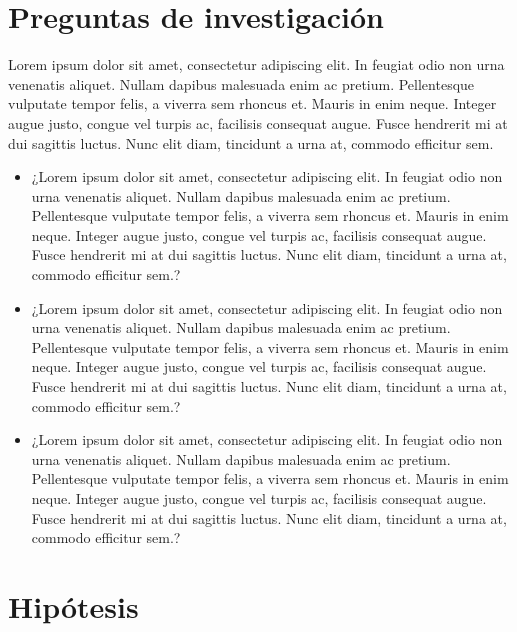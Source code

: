 \documentclass[letterpaper,twoside,10pt]{report}
\begin{document}
\section{Preguntas de investigación}

Lorem ipsum dolor sit amet, consectetur adipiscing elit. In feugiat odio non urna venenatis aliquet. Nullam dapibus malesuada enim ac pretium. Pellentesque vulputate tempor felis, a viverra sem rhoncus et. Mauris in enim neque. Integer augue justo, congue vel turpis ac, facilisis consequat augue. Fusce hendrerit mi at dui sagittis luctus. Nunc elit diam, tincidunt a urna at, commodo efficitur sem.

\begin{itemize}

 \item ¿Lorem ipsum dolor sit amet, consectetur adipiscing elit. In feugiat odio non urna venenatis aliquet. Nullam dapibus malesuada enim ac pretium. Pellentesque vulputate tempor felis, a viverra sem rhoncus et. Mauris in enim neque. Integer augue justo, congue vel turpis ac, facilisis consequat augue. Fusce hendrerit mi at dui sagittis luctus. Nunc elit diam, tincidunt a urna at, commodo efficitur sem.?
 \item ¿Lorem ipsum dolor sit amet, consectetur adipiscing elit. In feugiat odio non urna venenatis aliquet. Nullam dapibus malesuada enim ac pretium. Pellentesque vulputate tempor felis, a viverra sem rhoncus et. Mauris in enim neque. Integer augue justo, congue vel turpis ac, facilisis consequat augue. Fusce hendrerit mi at dui sagittis luctus. Nunc elit diam, tincidunt a urna at, commodo efficitur sem.?
 \item ¿Lorem ipsum dolor sit amet, consectetur adipiscing elit. In feugiat odio non urna venenatis aliquet. Nullam dapibus malesuada enim ac pretium. Pellentesque vulputate tempor felis, a viverra sem rhoncus et. Mauris in enim neque. Integer augue justo, congue vel turpis ac, facilisis consequat augue. Fusce hendrerit mi at dui sagittis luctus. Nunc elit diam, tincidunt a urna at, commodo efficitur sem.?
\end{itemize}

\section{Hipótesis}
\end{document}
